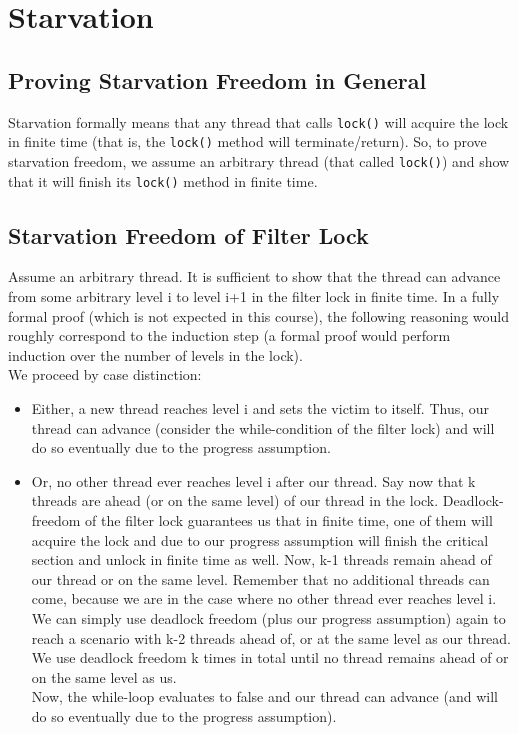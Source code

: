 \documentclass{article}
\begin{document}
    \section{Starvation}
    \subsection{Proving Starvation Freedom in General}
    Starvation formally means that any thread that calls \texttt{lock()} will acquire the lock in finite time (that is, the \texttt{lock()} method will terminate/return). So, to prove starvation freedom, we assume an arbitrary thread (that called \texttt{lock()}) and show that it will finish its \texttt{lock()} method in finite time.

    \subsection{Starvation Freedom of Filter Lock}
    Assume an arbitrary thread. It is sufficient to show that the thread can advance from some arbitrary level i to level i+1 in the filter lock in finite time. In a fully formal proof (which is not expected in this course), the following reasoning would roughly correspond to the induction step (a formal proof would perform induction over the number of levels in the lock).\\
    We proceed by case distinction:
    \begin{itemize}
      \item Either, a new thread reaches level i and sets the victim to itself. Thus, our thread can advance (consider the while-condition of the filter lock) and will do so eventually due to the progress assumption.
      \item Or, no other thread ever reaches level i after our thread. Say now that k threads are ahead (or on the same level) of our thread in the lock. Deadlock-freedom of the filter lock guarantees us that in finite time, one of them will acquire the lock and due to our progress assumption will finish the critical section and unlock in finite time as well. Now, k-1 threads remain ahead of our thread or on the same level. Remember that no additional threads can come, because we are in the case where no other thread ever reaches level i. We can simply use deadlock freedom (plus our progress assumption) again to reach a scenario with k-2 threads ahead of, or at the same level as our thread. We use deadlock freedom k times in total until no thread remains ahead of or on the same level as us.\\ Now, the while-loop evaluates to false and our thread can advance (and will do so eventually due to the progress assumption).
    \end{itemize}
\end{document}
